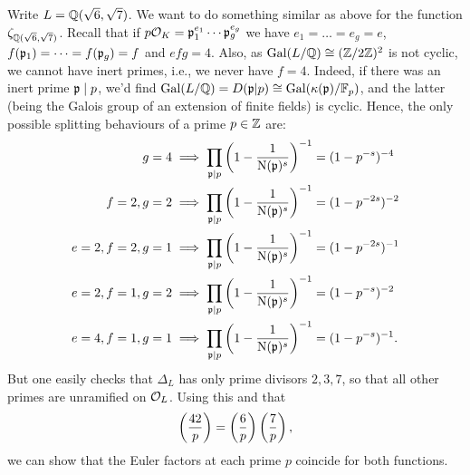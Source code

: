 \documentclass[a4paper,11pt]{article}
\begin{document}
Write $L = \mathbb{Q}(\sqrt 6, \sqrt 7)$. We want to do something similar as above for the
function $\zeta_{\mathbb{Q}(\sqrt 6, \sqrt 7)}$. Recall that if $p \mathcal{O}_K = \mathfrak{p}_1^{e_1} \cdots
\mathfrak{p}_g^{e_g}$ we have $e_1 = \dots = e_g = e$, $f(\mathfrak{p}_1) = \dots = f(\mathfrak{p}_g) = f$ and
$efg = 4$. Also, as $\operatorname{Gal}(L/\mathbb{Q}) \cong (\mathbb{Z}/2\mathbb{Z})^2$ is not cyclic, we cannot have 
inert primes, i.e., we never have $f=4$. Indeed, if there was an inert prime $\mathfrak{p} \mid p$,
we'd find $\operatorname{Gal}(L/\mathbb{Q}) = D(\mathfrak{p}|p) \cong \operatorname{Gal}(\kappa(\mathfrak{p})/\mathbb{F}_p)$, and the latter 
(being the Galois group of an extension of finite fields) is cyclic. 
Hence, the only possible splitting behaviours of a prime $p \in \mathbb{Z}$ are:
\begin{equation*}
    \begin{aligned}
        g = 4 &\implies \prod_{\mathfrak{p} \mid p}\left(1 - \frac1{\operatorname{N}(\mathfrak{p})^s}\right)^{-1} = (1 - p^{-s})^{-4} \\
        f = 2, g = 2 &\implies \prod_{\mathfrak{p} \mid p}\left(1 - \frac1{\operatorname{N}(\mathfrak{p})^s}\right)^{-1} = (1 - p^{-2s})^{-2} \\
        e = 2, f = 2, g = 1 &\implies \prod_{\mathfrak{p} \mid p}\left(1 - \frac1{\operatorname{N}(\mathfrak{p})^s}\right)^{-1} = (1 - p^{-2s})^{-1} \\
        e = 2, f = 1, g = 2 &\implies \prod_{\mathfrak{p} \mid p}\left(1 - \frac1{\operatorname{N}(\mathfrak{p})^s}\right)^{-1} = (1 - p^{-s})^{-2} \\
        e = 4, f = 1, g = 1 &\implies \prod_{\mathfrak{p} \mid p}\left(1 - \frac1{\operatorname{N}(\mathfrak{p})^s}\right)^{-1} = (1 - p^{-s})^{-1}.
    \end{aligned}
\end{equation*}
But one easily checks that $\Delta_L$ has only prime divisors $2,3,7$, so that all other
primes are unramified on $\mathcal{O}_L$. Using this and that
\begin{equation*}
    \left( \frac{42}{p} \right)= \left( \frac{6}{p} \right) \left( \frac{7}{p} \right),
\end{equation*}
we can show that the Euler factors at each prime $p$ coincide for both functions.
\end{document}
